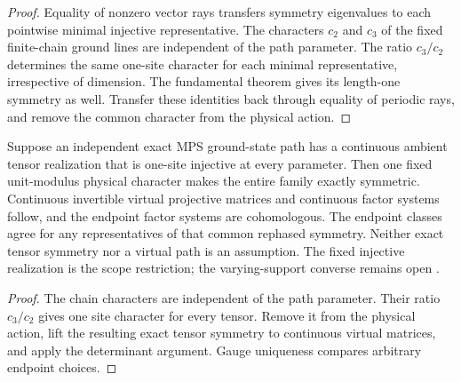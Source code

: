 \begin{proof}\leanok
    Equality of nonzero vector rays transfers symmetry eigenvalues to
    each pointwise minimal injective representative. The characters
    $c_2$ and $c_3$ of the fixed finite-chain ground lines are independent
    of the path parameter. The ratio $c_3/c_2$ determines the same one-site
    character for each minimal representative, irrespective of dimension.
    The fundamental theorem gives its length-one symmetry as well.
    Transfer these identities back through equality of periodic rays,
    and remove the common character from the physical action.
\end{proof}

\begin{lemma}
    \label{thm:spt_fixed_bond_physical_converse}
    \leanok

    Suppose an independent exact MPS ground-state path has a continuous
    ambient tensor realization that is one-site injective at every
    parameter. Then one fixed unit-modulus physical character makes
    the entire family exactly symmetric. Continuous invertible virtual
    projective matrices and continuous factor systems follow, and the
    endpoint factor systems are cohomologous. The endpoint classes agree
    for any representatives of that common rephased symmetry.
    Neither exact tensor symmetry nor a virtual path is an assumption.
    The fixed injective realization is the scope restriction; the
    varying-support converse remains open
    \cite{gap:spc11_spt_interpolation_upper_range}.
\end{lemma}

\begin{proof}\leanok
    The chain characters are independent of the path parameter.
    Their ratio $c_3/c_2$ gives one site character for every tensor.
    Remove it from the physical action, lift the resulting exact tensor
    symmetry to continuous virtual matrices, and apply the determinant
    argument. Gauge uniqueness compares arbitrary endpoint choices.
\end{proof}

